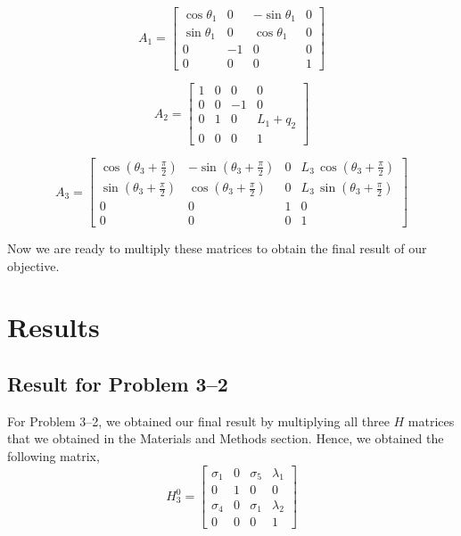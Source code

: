 \documentclass[conference]{IEEEtran}
\begin{document}
\[
    A_1 =
    \begin{bmatrix}
        \cos \theta_1 & 0 & -\sin \theta_1 & 0\\
        \sin \theta_1 & 0 & \cos  \theta_1 & 0\\
        0 & -1 & 0 & 0\\
        0 & 0 & 0 & 1
        \end{bmatrix}
\]

\[
    A_2 = 
    \begin{bmatrix}
        1 & 0 & 0 & 0\\
        0 & 0 & -1 & 0\\
        0 & 1 & 0 & L_1 + q_2 \\
        0 & 0 & 0 & 1
        \end{bmatrix}
\]

\[
    A_3 =
    \begin{bmatrix}
        \cos \left(\theta_3 +\frac{\pi }{2}\right) & -\sin \left(\theta_3 +\frac{\pi }{2}\right) & 0 & L_3 \,\cos \left(\theta_3 +\frac{\pi }{2}\right)\\
        \sin \left(\theta_3 +\frac{\pi }{2}\right) & \cos \left(\theta_3 +\frac{\pi }{2}\right) & 0 & L_3 \,\sin \left(\theta_3 +\frac{\pi }{2}\right)\\
        0 & 0 & 1 & 0\\
        0 & 0 & 0 & 1
        \end{bmatrix}
\]

Now we are ready to multiply these matrices to obtain the final result
of our objective.

\section{Results}

\subsection{Result for Problem 3--2}

For Problem 3--2, we obtained our final result by multiplying all three $H$ matrices
that we obtained in the Materials and Methods section. Hence, we obtained the following
matrix,
\[
    H^0_3 =
    \begin{bmatrix}
        \sigma_1  & 0 & \sigma_5  & \lambda_1\\
        0 & 1 & 0 & 0\\
        \sigma_4  & 0 & \sigma_1  & \lambda_2\\
        0 & 0 & 0 & 1
    \end{bmatrix}
\]
\end{document}
